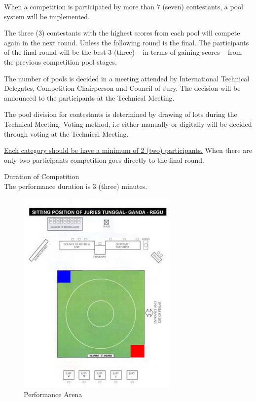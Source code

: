 \begin{legal}
    \begin{legal}
    \item When a competition is participated by more than 7 (seven) contestants, a pool system will be implemented.
    \item The three (3) contestants with the highest scores from each pool will compete again in the next round. 
    Unless the following round is the final. The participants of the final round will be the best 3 (three) – in 
    terms of gaining scores – from the previous competition pool stages.
    \item The number of pools is decided in a meeting attended by International Technical Delegates, 
    Competition Chairperson and Council of Jury. The decision will be announced to the participants at the 
    Technical Meeting.
    \item The pool division for contestants is determined by drawing of lots during the Technical Meeting. 
    Voting method, i.e either manually or digitally will be decided through voting at the Technical Meeting.
    \item \underline{Each category should be have a minimum of 2 (two) participants.} When there are only two participants
    competition goes directly to the final round.
    \end{legal}



\item Duration of Competition\\
The performance duration is 3 (three) minutes.

    \begin{figure}[ht!]
    \centering
    \includegraphics[height=4.0in]{images/performance_arena}
    \caption{Performance Arena}
    \label{fig:performance_arena}
    \end{figure}




\end{legal}
